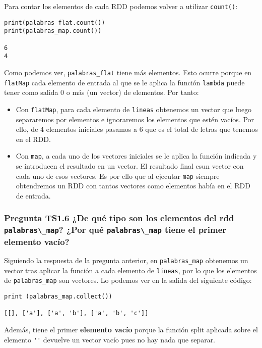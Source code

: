 \documentclass[11pt]{article}
\def\inline{\lstinline[basicstyle=\ttfamily,keywordstyle={}]}
\begin{document}
Para contar los elementos de cada RDD podemos volver a utilizar \inline{count()}:

\begin{verbatim}
print(palabras_flat.count())
print(palabras_map.count())

6
4
\end{verbatim}

Como podemos ver, \inline{palabras_flat} tiene más elementos. Esto ocurre porque en \inline{flatMap} cada elemento de entrada al que se le aplica la función \inline{lambda} puede tener como salida 0 o más (un vector) de elementos. Por tanto:

\begin{itemize}
	\item Con \inline{flatMap}, para cada elemento de \inline{lineas} obtenemos un vector que luego separaremos por elementos e ignoraremos los elementos que estén vacíos. Por ello, de 4 elementos iniciales pasamos a 6 que es el total de letras que tenemos en el RDD.
	
	\item Con \inline{map}, a cada uno de los vectores iniciales se le aplica la función indicada y se introducen el resultado en un vector. El resultado final esun vector con cada uno de esos vectores. Es por ello que al ejecutar \inline{map} siempre obtendremos un RDD con tantos vectores como elementos había en el RDD de entrada.
\end{itemize}

\subsubsection*{ Pregunta TS1.6 ¿De qué tipo son los elementos del rdd \inline{palabras\_map}? ¿Por qué \inline{palabras\_map} tiene el primer elemento vacío?}

Siguiendo la respuesta de la pregunta anterior, en \inline{palabras_map} obtenemos un vector tras aplicar la función a cada elemento de \inline{lineas}, por lo que los elementos de \inline{palabras_map} son vectores. Lo podemos ver en la salida del siguiente código:

\begin{verbatim}
print (palabras_map.collect())

[[], ['a'], ['a', 'b'], ['a', 'b', 'c']]
\end{verbatim}

Además, tiene el primer \textbf{elemento vacío} porque la función split aplicada sobre el elemento \inline{''} devuelve un vector vacío pues no hay nada que separar.
\end{document}
